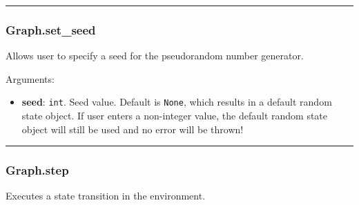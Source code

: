 \begin{Shaded}
\begin{Highlighting}[]
\OperatorTok{=}
\end{Highlighting}
\end{Shaded}

\begin{center}\rule{0.5\linewidth}{\linethickness}\end{center}

\subsubsection{Graph.set\_seed}\label{graph.set_seed}

\begin{Shaded}
\begin{Highlighting}[]
\OperatorTok{=}\NormalTok{)}
\end{Highlighting}
\end{Shaded}

Allows user to specify a seed for the pseudorandom number generator.

Arguments:

\begin{itemize}
\tightlist
\item
  \textbf{seed}: \texttt{int}. Seed value. Default is \texttt{None},
  which results in a default random state object. If user enters a
  non-integer value, the default random state object will still be used
  and no error will be thrown!
\end{itemize}

\begin{center}\rule{0.5\linewidth}{\linethickness}\end{center}

\subsubsection{Graph.step}\label{graph.step}

\begin{Shaded}
\begin{Highlighting}[]
\end{Highlighting}
\end{Shaded}

Executes a state transition in the environment.

